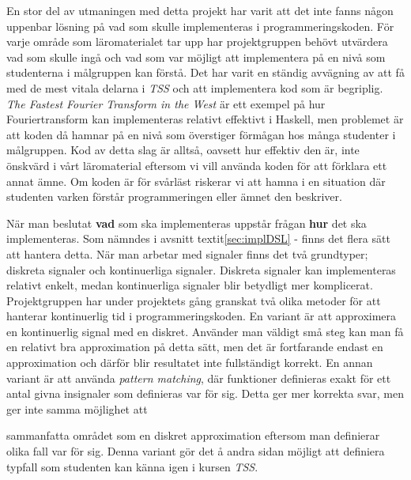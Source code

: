 \documentclass[]{article}
\begin{document}
En stor del av utmaningen med detta projekt har varit att det inte
fanns någon uppenbar lösning på vad som skulle implementeras i
programmeringskoden. För varje område som läromaterialet tar upp har
projektgruppen behövt utvärdera vad som skulle ingå och vad som var
möjligt att implementera på en nivå som studenterna i målgruppen kan
förstå. Det har varit en ständig avvägning av att få med de mest
vitala delarna i \textit{TSS} och att implementera kod som är
begriplig. \textit{The Fastest Fourier Transform in the West}
\cite{fastestfourier} %
är ett exempel på hur Fouriertransform kan implementeras relativt
effektivt i Haskell, men problemet är att koden då hamnar på en nivå
som överstiger förmågan hos många studenter i målgruppen. Kod av detta
slag är alltså, oavsett hur effektiv den är, inte önskvärd i vårt
läromaterial eftersom vi vill använda koden för att förklara ett annat
ämne. Om koden är för svårläst riskerar vi att hamna i en situation
där studenten varken förstår programmeringen eller ämnet den
beskriver.

När man beslutat \textbf{vad} som ska implementeras uppstår frågan
\textbf{hur} det ska implementeras. Som nämndes i
avsnitt textit{\ref{sec:implDSL} - }
finns det flera sätt att hantera detta. När man arbetar med signaler
finns det två grundtyper; diskreta signaler och kontinuerliga
signaler. Diskreta signaler kan implementeras relativt enkelt, medan
kontinuerliga signaler blir betydligt mer komplicerat. Projektgruppen
har under projektets gång granskat två olika metoder för att hanterar
kontinuerlig tid i programmeringskoden. En variant är att approximera
en kontinuerlig signal med en diskret. Använder man väldigt små steg
kan man få en relativt bra approximation på detta sätt, men det är
fortfarande endast en approximation och därför blir resultatet inte
fullständigt korrekt.
En annan variant är att använda \textit{pattern matching}, där
funktioner definieras exakt för ett antal givna insignaler som
definieras var för sig. Detta ger mer korrekta svar, men ger inte
samma möjlighet att

sammanfatta
området som en diskret approximation eftersom man definierar
olika fall var för sig. Denna
variant gör det å andra sidan möjligt att definiera typfall som
studenten kan känna igen i kursen \textit{TSS}.
\end{document}
